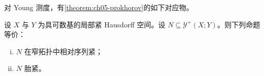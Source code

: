 \documentclass[../../main.tex]{subfiles}%
\begin{document}
对 Young 测度，有\cref{theorem:ch05-prokhorov}的如下对应物。

\begin{theorem}\label{theorem:ch05-弱紧Young}
设 $X$ 与 $Y$ 为具可数基的局部紧 Hausdorff 空间。设 $N\subseteq\mathcal{Y}^+(X;Y)$。则下列命题等价：
\begin{enumerate}[(i)]
\item\label{item:ch05-youngcomp-i} $N$ 在窄拓扑中相对序列紧；
\item\label{item:ch05-youngcomp-ii} $N$ 胎紧。
\end{enumerate}
\end{theorem}

\end{document}
